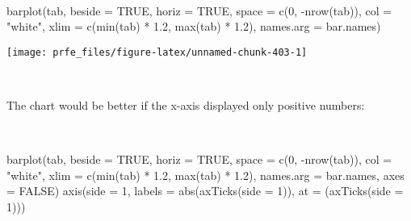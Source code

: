 \documentclass[
  12pt,
  a4paper]{book}
\newenvironment{Shaded}{\begin{snugshade}}{\end{snugshade}}
\newcommand{\AttributeTok}[1]{\textcolor[rgb]{0.77,0.63,0.00}{#1}}
\newcommand{\ConstantTok}[1]{\textcolor[rgb]{0.00,0.00,0.00}{#1}}
\newcommand{\DecValTok}[1]{\textcolor[rgb]{0.00,0.00,0.81}{#1}}
\newcommand{\FloatTok}[1]{\textcolor[rgb]{0.00,0.00,0.81}{#1}}
\newcommand{\FunctionTok}[1]{\textcolor[rgb]{0.00,0.00,0.00}{#1}}
\newcommand{\NormalTok}[1]{#1}
\newcommand{\SpecialCharTok}[1]{\textcolor[rgb]{0.00,0.00,0.00}{#1}}
\newcommand{\StringTok}[1]{\textcolor[rgb]{0.31,0.60,0.02}{#1}}
\begin{document}
~

\begin{Shaded}
\begin{Highlighting}[]
\FunctionTok{barplot}\NormalTok{(tab, }\AttributeTok{beside =} \ConstantTok{TRUE}\NormalTok{, }\AttributeTok{horiz =} \ConstantTok{TRUE}\NormalTok{, }\AttributeTok{space =} \FunctionTok{c}\NormalTok{(}\DecValTok{0}\NormalTok{, }\SpecialCharTok{{-}}\FunctionTok{nrow}\NormalTok{(tab)),}
        \AttributeTok{col =} \StringTok{"white"}\NormalTok{, }\AttributeTok{xlim =} \FunctionTok{c}\NormalTok{(}\FunctionTok{min}\NormalTok{(tab) }\SpecialCharTok{*} \FloatTok{1.2}\NormalTok{, }\FunctionTok{max}\NormalTok{(tab) }\SpecialCharTok{*} \FloatTok{1.2}\NormalTok{),}
        \AttributeTok{names.arg =}\NormalTok{ bar.names)}
\end{Highlighting}
\end{Shaded}

\begin{center}\texttt{[image: prfe\_files/figure-latex/unnamed-chunk-403-1]} \end{center}

~

The chart would be better if the x-axis displayed only positive numbers:

~

\begin{Shaded}
\begin{Highlighting}[]
\FunctionTok{barplot}\NormalTok{(tab, }\AttributeTok{beside =} \ConstantTok{TRUE}\NormalTok{, }\AttributeTok{horiz =} \ConstantTok{TRUE}\NormalTok{, }\AttributeTok{space =} \FunctionTok{c}\NormalTok{(}\DecValTok{0}\NormalTok{, }\SpecialCharTok{{-}}\FunctionTok{nrow}\NormalTok{(tab)),}
        \AttributeTok{col =} \StringTok{"white"}\NormalTok{, }\AttributeTok{xlim =} \FunctionTok{c}\NormalTok{(}\FunctionTok{min}\NormalTok{(tab) }\SpecialCharTok{*} \FloatTok{1.2}\NormalTok{, }\FunctionTok{max}\NormalTok{(tab) }\SpecialCharTok{*} \FloatTok{1.2}\NormalTok{),}
        \AttributeTok{names.arg =}\NormalTok{ bar.names, }\AttributeTok{axes =} \ConstantTok{FALSE}\NormalTok{)}
\FunctionTok{axis}\NormalTok{(}\AttributeTok{side =} \DecValTok{1}\NormalTok{,}
     \AttributeTok{labels =} \FunctionTok{abs}\NormalTok{(}\FunctionTok{axTicks}\NormalTok{(}\AttributeTok{side =} \DecValTok{1}\NormalTok{)),}
     \AttributeTok{at =}\NormalTok{ (}\FunctionTok{axTicks}\NormalTok{(}\AttributeTok{side =} \DecValTok{1}\NormalTok{)))}
\end{Highlighting}
\end{Shaded}
\end{document}
